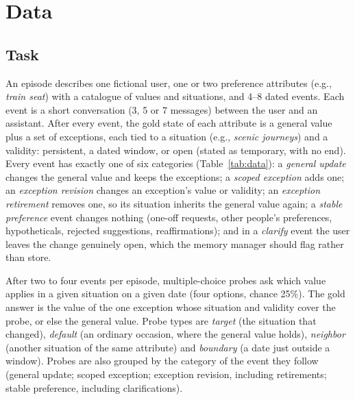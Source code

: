 \documentclass[11pt]{article}
\begin{document}
\section{Data}\label{sec:data}

\subsection{Task}
An episode describes one fictional user, one or two preference attributes (e.g., \emph{train seat}) with a catalogue of values and situations, and 4--8 dated events. Each event is a short conversation (3, 5 or 7 messages) between the user and an assistant. After every event, the gold state of each attribute is a general value plus a set of exceptions, each tied to a situation (e.g., \emph{scenic journeys}) and a validity: persistent, a dated window, or open (stated as temporary, with no end). Every event has exactly one of six categories (Table~\ref{tab:data}): a \emph{general update} changes the general value and keeps the exceptions; a \emph{scoped exception} adds one; an \emph{exception revision} changes an exception's value or validity; an \emph{exception retirement} removes one, so its situation inherits the general value again; a \emph{stable preference} event changes nothing (one-off requests, other people's preferences, hypotheticals, rejected suggestions, reaffirmations); and in a \emph{clarify} event the user leaves the change genuinely open, which the memory manager should flag rather than store.

After two to four events per episode, multiple-choice probes ask which value applies in a given situation on a given date (four options, chance 25\%). The gold answer is the value of the one exception whose situation and validity cover the probe, or else the general value. Probe types are \emph{target} (the situation that changed), \emph{default} (an ordinary occasion, where the general value holds), \emph{neighbor} (another situation of the same attribute) and \emph{boundary} (a date just outside a window). Probes are also grouped by the category of the event they follow (general update; scoped exception; exception revision, including retirements; stable preference, including clarifications).
\end{document}
